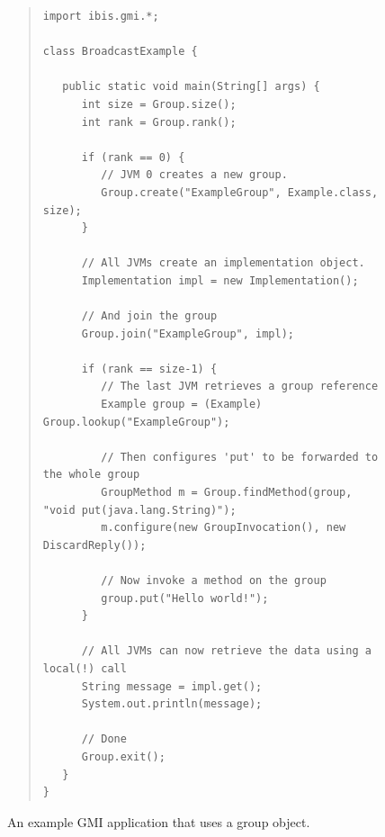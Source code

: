 \documentclass[10pt]{article}
\begin{document}
\begin{figure}[t!]
\small{
\begin{quote}
\begin{verbatim}
import ibis.gmi.*;

class BroadcastExample {

   public static void main(String[] args) {
      int size = Group.size();
      int rank = Group.rank();

      if (rank == 0) {
         // JVM 0 creates a new group. 
         Group.create("ExampleGroup", Example.class, size);
      } 

      // All JVMs create an implementation object.
      Implementation impl = new Implementation();
   
      // And join the group
      Group.join("ExampleGroup", impl);

      if (rank == size-1) { 
         // The last JVM retrieves a group reference
         Example group = (Example) Group.lookup("ExampleGroup");

         // Then configures 'put' to be forwarded to the whole group
         GroupMethod m = Group.findMethod(group, "void put(java.lang.String)");
         m.configure(new GroupInvocation(), new DiscardReply());

         // Now invoke a method on the group
         group.put("Hello world!");
      } 

      // All JVMs can now retrieve the data using a local(!) call
      String message = impl.get();        
      System.out.println(message);

      // Done   
      Group.exit();
   }
} 
\end{verbatim}
\end{quote}
}
\caption{An example GMI application that uses a group object.}
\label{gmi-2}
\end{figure}
\end{document}
